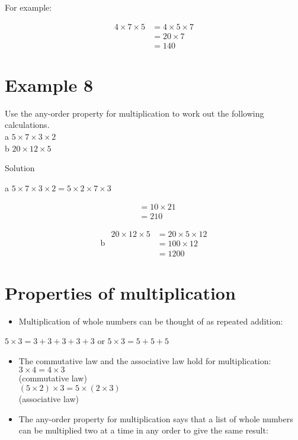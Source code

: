 \documentclass[10pt]{article}
\begin{document}
For example:

\[
\begin{aligned}
4 \times 7 \times 5 & =4 \times 5 \times 7 \\
& =20 \times 7 \\
& =140
\end{aligned}
\]

\section*{Example 8}
Use the any-order property for multiplication to work out the following calculations.\\
a \(5 \times 7 \times 3 \times 2\)\\
b \(20 \times 12 \times 5\)

Solution

a \(5 \times 7 \times 3 \times 2=5 \times 2 \times 7 \times 3\)

\[
\begin{aligned}
& =10 \times 21 \\
& =210
\end{aligned}
\]

\[
\text { b } \begin{aligned}
20 \times 12 \times 5 & =20 \times 5 \times 12 \\
& =100 \times 12 \\
& =1200
\end{aligned}
\]

\section*{Properties of multiplication}
\begin{itemize}
  \item Multiplication of whole numbers can be thought of as repeated addition:
\end{itemize}

\(5 \times 3=3+3+3+3+3\) or \(5 \times 3=5+5+5\)

\begin{itemize}
  \item The commutative law and the associative law hold for multiplication:\\
\(3 \times 4=4 \times 3\)\\
(commutative law)\\
\((5 \times 2) \times 3=5 \times(2 \times 3)\)\\
(associative law)
  \item The any-order property for multiplication says that a list of whole numbers can be multiplied two at a time in any order to give the same result:
\end{itemize}
\end{document}
